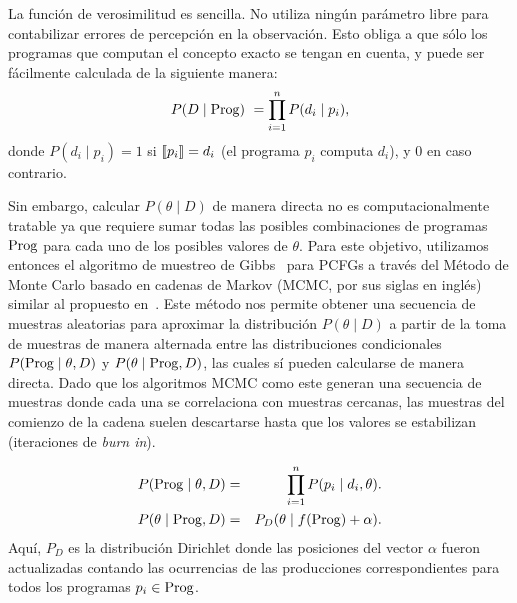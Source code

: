 
La función de verosimilitud es sencilla. No utiliza ningún parámetro libre para contabilizar errores de percepción en la observación. Esto obliga a que sólo los programas que computan el concepto exacto se tengan en cuenta, y puede ser fácilmente calculada de la siguiente manera:
%
\begin{equation*}
\label{eqD}
P(D \mid {\rm Prog})\ = \prod\limits_{i = 1}^n P(d_i \mid p_i),
\end{equation*}
%
donde $P(d_i \mid p_i) = 1 $ si $\llbracket p_i\rrbracket = d_i$ (el programa $p_i$ computa $d_i$), y 0 en caso contrario. 

Sin embargo, calcular $P(\theta \mid D)$ de manera directa no es computacionalmente tratable ya que requiere sumar todas las posibles combinaciones de programas ${\rm Prog}$ para cada uno de los posibles valores de $\theta$. Para este objetivo, utilizamos entonces el algoritmo de muestreo de Gibbs~\cite{geman1984stochastic} para PCFGs a través del Método de Monte Carlo basado en cadenas de Markov (MCMC, por sus siglas en inglés) similar al propuesto en~\cite{johnson2007bayesian}. Este método nos permite obtener una secuencia de muestras aleatorias para aproximar la distribución $P(\theta \mid D)$ a partir de la toma de muestras de manera alternada entre las distribuciones condicionales $P({\rm Prog} \mid \theta, D)$ y $P(\theta \mid {\rm Prog}, D)$, las cuales sí pueden calcularse de manera directa. Dado que los algoritmos MCMC como este generan una secuencia de muestras donde cada una se correlaciona con muestras cercanas, las muestras del comienzo de la cadena suelen descartarse hasta que los valores se estabilizan (iteraciones de \textit{burn in}).

%
\begin{eqnarray*}
\label{eqE}
P({\rm Prog} \mid \theta, D) &=& \prod\limits_{i=1}^n P(p_i \mid d_i, \theta).\\
P(\theta \mid {\rm Prog}, D) &=& P_D(\theta \mid f({\rm Prog}) + \alpha).
\end{eqnarray*}
Aquí, $P_D$ es la distribución Dirichlet donde las posiciones del vector $\alpha$ fueron actualizadas contando las ocurrencias de las producciones correspondientes para todos los programas $p_i \in {\rm Prog}$.

